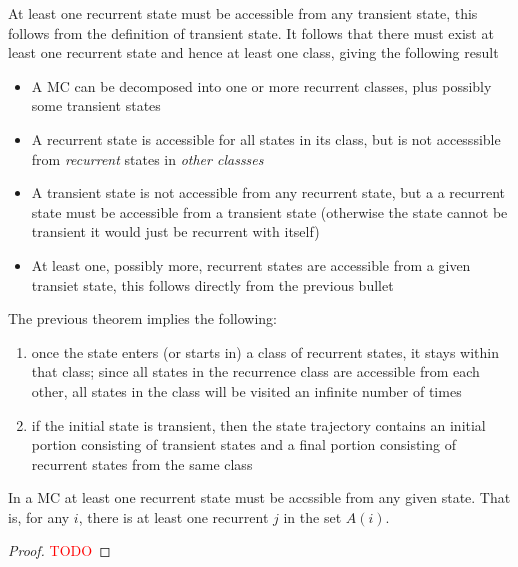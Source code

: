 \documentclass[11pt]{scrartcl}
\begin{document}
At least one recurrent state must be accessible from any transient state, this
follows from the definition of transient state. It follows that there must
exist at least one recurrent state and hence at least one class, giving the
following result
\begin{theorem}
  \begin{itemize}
    \item A MC can be decomposed into one or more recurrent classes, plus
      possibly some transient states
      \item  A recurrent state is accessible for all states in its class, but
        is not accesssible from \emph{recurrent} states in \emph{other classses}
        \item  A transient state is not accessible from any recurrent state,
          but a a recurrent state must be accessible from a transient state
          (otherwise the state cannot be transient it would just be recurrent
          with itself)
          \item  At least one, possibly more, recurrent states are accessible
            from a given transiet state, this follows directly from the
            previous bullet 
  \end{itemize}
\end{theorem}
The previous theorem implies the following:
\begin{enumerate}
  \item  once the state enters (or starts in) a class of recurrent states, it
    stays within that class; since all states in the recurrence class are
    accessible from each other, all states in the class will be visited
    an infinite number of times
    \item  if the initial state is transient, then the state trajectory
      contains an initial portion consisting of transient states and a final
      portion consisting of recurrent states from the same class
\end{enumerate}
\begin{example}
  In a MC at least one recurrent state must be accssible from any given state.
  That is, for any $i$, there is at least one recurrent $j$ in the set $A(i)$. 
  \begin{proof}
    \textcolor{red}{TODO} 
  \end{proof}
\end{example}
\end{document}
